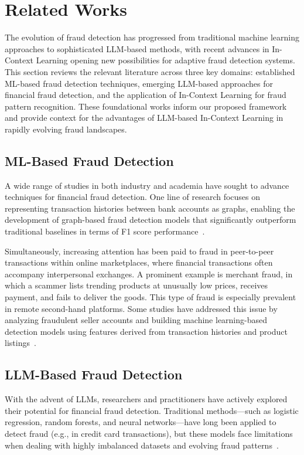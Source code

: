 \documentclass[sigconf]{acmart}
\begin{document}
\section{Related Works}\label{related_work}
The evolution of fraud detection has progressed from traditional machine learning approaches to sophisticated LLM-based methods, with recent advances in In-Context Learning opening new possibilities for adaptive fraud detection systems. This section reviews the relevant literature across three key domains: established ML-based fraud detection techniques, emerging LLM-based approaches for financial fraud detection, and the application of In-Context Learning for fraud pattern recognition. These foundational works inform our proposed framework and provide context for the advantages of LLM-based In-Context Learning in rapidly evolving fraud landscapes.

\subsection{ML-Based Fraud Detection}
A wide range of studies in both industry and academia have sought to advance techniques for financial fraud detection. One line of research focuses on representing transaction histories between bank accounts as graphs, enabling the development of graph-based fraud detection models that significantly outperform traditional baselines in terms of F1 score performance~\cite{lin2024graphtransformer, yoo2023medicare}.

Simultaneously, increasing attention has been paid to fraud in peer-to-peer transactions within online marketplaces, where financial transactions often accompany interpersonal exchanges. A prominent example is merchant fraud, in which a scammer lists trending products at unusually low prices, receives payment, and fails to deliver the goods. This type of fraud is especially prevalent in remote second-hand platforms. Some studies have addressed this issue by analyzing fraudulent seller accounts and building machine learning-based detection models using features derived from transaction histories and product listings~\cite{hasan2022ecommerce, renjith2018}.

\subsection{LLM-Based Fraud Detection}  
With the advent of LLMs, researchers and practitioners have actively explored their potential for financial fraud detection. Traditional methods—such as logistic regression, random forests, and neural networks—have long been applied to detect fraud (e.g., in credit card transactions), but these models face limitations when dealing with highly imbalanced datasets and evolving fraud patterns~\cite{yu2024card_fds}.
\end{document}
